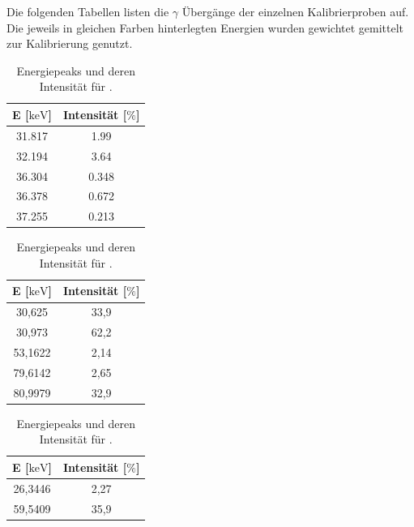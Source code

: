 \documentclass[slug=CS, room=Andreas-Schubert-Bau\,\ Labor\ 406,
supervisor=Juliane\ Volkmer, coursedate=29.\ 11.\ 2019]{../../Lab_Report_LaTeX/lab_report}
\newcommand{\am}{\ce{^241Am} }
\begin{document}
Die folgenden Tabellen listen die \(\gamma\) \"Uberg\"ange der
einzelnen Kalibrierproben auf. Die jeweils in gleichen Farben
hinterlegten Energien wurden gewichtet gemittelt zur Kalibrierung genutzt.

\begin{table}[H]
  \centering
  \begin{tabular}{S|S}
    \toprule
    {E [\(\si{\kilo\electronvolt}\)]} & {Intensität [\(\si{\percent}\)]} \\
    \midrule
     31.817                            & 1.99                            \\
     32.194                            & 3.64                            \\
    36.304                            & 0.348                           \\
    36.378                            & 0.672                           \\
    37.255                            & 0.213
  \end{tabular}
  \caption{Energiepeaks und deren Intensität für .}
  \label{tab:cspeaks}
\end{table}
\begin{table}[H]
  \centering
  \begin{tabular}{S|S}
    \toprule
    {E [\(\si{\kilo\electronvolt}\)]} & {Intensität [\(\si{\percent}\)]} \\
    \midrule
     30,625                          & 33,9                          \\
     30,973                          & 62,2                          \\
     53,1622                         & 2,14                          \\
     79,6142                         & 2,65                          \\
     80,9979                         & 32,9
  \end{tabular}
  \caption{Energiepeaks und deren Intensität für .}
  \label{tab:bapeaks}
\end{table}
\begin{table}[H]
  \centering
  \begin{tabular}{S|S}
    \toprule
    {E [\(\si{\kilo\electronvolt}\)]} & {Intensität [\(\si{\percent}\)]} \\
    \midrule
     26,3446                           & 2,27                            \\
     59,5409                           & 35,9
  \end{tabular}
  \caption{Energiepeaks und deren Intensität für \am{}.}
  \label{tab:ampeaks}
\end{table}
\end{document}
